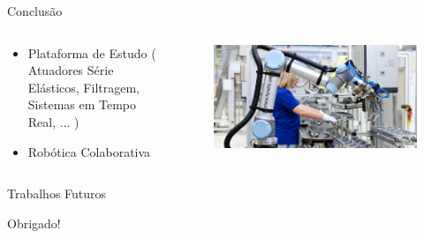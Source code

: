 \documentclass{beamer}
\begin{document}
\begin{frame}{Conclusão}
\begin{columns}
\begin{column}{0.4\textwidth}
\begin{itemize}
    \item Plataforma de Estudo ( Atuadores Série Elásticos, Filtragem, Sistemas em Tempo Real, ... )
    \item Robótica Colaborativa
\end{itemize}
\end{column}
\begin{column}{0.6\textwidth}  %
\begin{figure}
    \centering
    \includegraphics[width = \linewidth]{tex/figs/ur-production.jpg}
\end{figure}
\end{column}
\end{columns}
\end{frame}

\begin{frame}{Trabalhos Futuros}
\end{frame}

\begin{frame}{}
\centering
\Huge{Obrigado!}
\end{frame}


\end{document}
